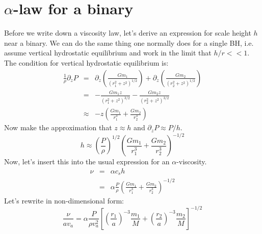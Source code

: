 \documentclass{article}
\begin{document}
\section{$\alpha$-law for a binary}
Before we write down a viscosity law, let's derive an expression for scale height $h$ near a binary. We can do the same thing one normally does for a single BH, i.e. assume vertical hydrostatic equilibrium and work in the limit that $h/r << 1$. The condition for vertical hydrostatic equilibrium is:
\begin{eqnarray*}
  \frac{1}{\rho}\partial_z P &=& \partial_z\left( \frac{G m_1}{(r_1^2+z^2)^{1/2}} \right) + \partial_z\left( \frac{G m_2}{(r_2^2+z^2)^{1/2}} \right)\\
                             &=& -\frac{G m_1 z}{(r_1^2+z^2)^{3/2}} - \frac{G m_2 z}{(r_2^2+z^2)^{3/2}}\\
                             &\approx& -z\left( \frac{G m_1}{r_1^3} + \frac{G m_2}{r_2^3} \right)
\end{eqnarray*}
Now make the approximation that $z \approx h$ and $\partial_z P \approx P/h$.
\begin{equation*}
  h \approx \left(\frac{P}{\rho}\right)^{1/2}\left(\frac{G m_1}{r_1^3}+\frac{G m_2}{r_2^3}\right)^{-1/2}
\end{equation*}
Now, let's insert this into the usual expression for an $\alpha$-viscosity.
\begin{eqnarray*}
  \nu &=& \alpha c_s h\\
      &=& \alpha \frac{P}{\rho}\left(\frac{G m_1}{r_1^3}+\frac{G m_2}{r_2^3}\right)^{-1/2}
\end{eqnarray*}
Let's rewrite in non-dimensional form:
\begin{equation*}
  \boxed{
  \frac{\nu}{a v_a} = \alpha \frac{P}{\rho v_a^2}\left[\left(\frac{r_1}{a}\right)^{-3}\frac{m_1}{M}+\left(\frac{r_2}{a}\right)^{-3}\frac{m_2}{M}\right]^{-1/2}
}
\end{equation*}
\end{document}
